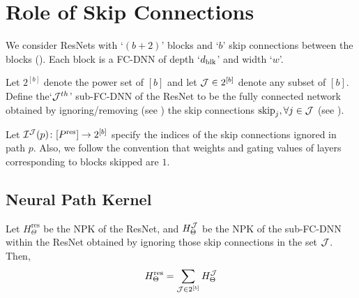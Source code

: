 \section{Role of Skip Connections}
We consider ResNets with `$(b+2)$' blocks and `$b$' skip connections between the blocks (). Each block is a FC-DNN of depth `$d_{\text{blk}}$' and width `$w$'. 
\begin{definition}
Let $2^{[b]}$ denote the power set of $[b]$ and let $\mathcal{J}\in 2^{[b]}$ denote any subset of $[b]$. Define the`$\mathcal{J}^{th}$' sub-FC-DNN of the ResNet to be the fully connected network obtained by ignoring/removing (see ) the skip connections $\text{skip}_j,\forall j\in \mathcal{J}$ (see ).
\end{definition}

\begin{notation}
Let $\mathcal{I}^{\mathcal{J}}(p)\colon [P^{\text{res}}]\rightarrow 2^{[b]}$ specify the indices of the skip connections ignored in path $p$.  Also, we follow the convention that weights and gating values of layers corresponding to blocks skipped are $1$.
\end{notation}

\subsection{Neural Path Kernel}

\begin{lemma}\label{lm:sumofproduct}
Let $H^{\text{res}}_{\Theta}$ be the NPK of the ResNet, and $H^{\mathcal{J}}_{\Theta}$ be the NPK of the sub-FC-DNN within the ResNet obtained by ignoring those skip connections in the set $\mathcal{J}$. Then, \begin{align*}H^{\text{res}}_{\Theta}=\sum_{\mathcal{J}\in 2^{[b]}}H^{\mathcal{J}}_{\Theta}\end{align*}
\end{lemma}


